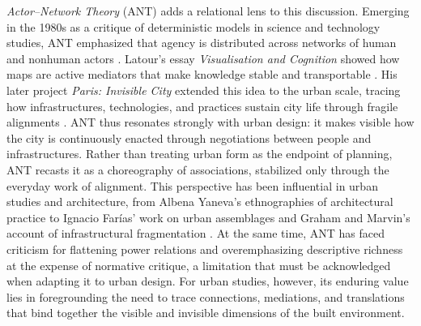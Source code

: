 \documentclass[land,article,accept,pdftex,oneauthor]{Definitions/mdpi}
\begin{document}
\textit{Actor--Network Theory} (ANT) adds a relational lens to this discussion. Emerging in the 1980s as a critique of deterministic models in science and technology studies, ANT emphasized that agency is distributed across networks of human and nonhuman actors \cite{akrich_sociologie_2006}. Latour’s essay \textit{Visualisation and Cognition} showed how maps are active mediators that make knowledge stable and transportable \cite{latour_visualisation_1986}. His later project \textit{Paris: Invisible City} extended this idea to the urban scale, tracing how infrastructures, technologies, and practices sustain city life through fragile alignments \cite{latour_paris_2021}. ANT thus resonates strongly with urban design: it makes visible how the city is continuously enacted through negotiations between people and infrastructures. Rather than treating urban form as the endpoint of planning, ANT recasts it as a choreography of associations, stabilized only through the everyday work of alignment. This perspective has been influential in urban studies and architecture, from Albena Yaneva’s ethnographies of architectural practice \cite{yaneva_mapping_2012} to Ignacio Farías’ work on urban assemblages \cite{farias_politics_2011} and Graham and Marvin’s account of infrastructural fragmentation \cite{graham_splintering_2001}. At the same time, ANT has faced criticism for flattening power relations and overemphasizing descriptive richness at the expense of normative critique, a limitation that must be acknowledged when adapting it to urban design. For urban studies, however, its enduring value lies in foregrounding the need to trace connections, mediations, and translations that bind together the visible and invisible dimensions of the built environment.
\end{document}
